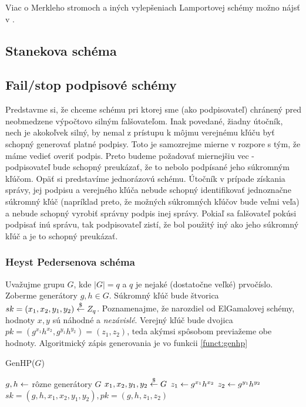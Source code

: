 Viac o Merkleho stromoch a iných vylepšeniach Lamportovej schémy
možno nájsť v \cite{merkle}.

\subsection{Stanekova schéma}
\todo{}

\subsection{Fail/stop podpisové schémy}

Predstavme si, že chceme schému pri ktorej sme (ako podpisovateľ) chránený pred neobmedzene výpočtovo silným
falšovateľom. Inak povedané, žiadny útočník, nech je akokoľvek silný,
by nemal z prístupu k môjmu verejnému kľúču byť schopný generovať
platné podpisy. Toto je samozrejme mierne v rozpore s tým, že máme
vedieť overiť podpis. Preto budeme požadovať miernejšiu vec -
podpisovateľ bude schopný preukázať, že to nebolo podpísané jeho
súkromným kľúčom.
Opäť si predstavíme jednorázovú schému. Útočník v prípade získania
správy, jej podpisu a verejného kľúča nebude schopný identifikovať
jednoznačne súkromný kľúč (napríklad preto, že možných súkromných
kľúčov bude veľmi veľa)
a nebude schopný vyrobiť správny podpis inej správy.
Pokiaľ sa falšovateľ pokúsi podpisať inú správu, tak podpisovateľ zistí, že bol použitý iný
ako jeho súkromný kľúč a je to schopný preukázať.

\subsubsection{Heyst Pedersenova schéma}

Uvažujme grupu $G$, kde $|G| = q$ a $q$ je nejaké (dostatočne veľké) prvočíslo.
Zoberme generátory $g, h \in G$.
Súkromný kľúč bude štvorica  $sk = (x_1, x_2, y_1, y_2) \overset{\$}{\leftarrow} Z_q$.
Poznamenajme, že narozdiel od ElGamalovej schémy, hodnoty $x,y$ sú
náhodné a \emph{nezávislé}.
Verejný kľúč bude dvojica
$pk = (g^{x_1} h^{x_2}, g^{y_1} h^{y_2}) = (z_1, z_2)$, teda akýmsi
spôsobom previažeme obe hodnoty. Algoritmický zápis generovania je vo
funkcii \ref{funct:genhp}

\begin{function}[h!]
    \caption{GenHP($G$)}
    \label{funct:genhp}
    $g,h \leftarrow $ rôzne generátory $G$\;
    $x_1,x_2,y_1,y_2 \overset{\$}{\leftarrow} G$\;
    $z_1 \leftarrow g^{x_1} h^{x_2}$\;
    $z_2 \leftarrow g^{y_1} h^{y_2}$\;
    \Return $sk=(g,h,x_1,x_2,y_1,y_2), pk=(g,h,z_1,z_2)$\;
\end{function}

